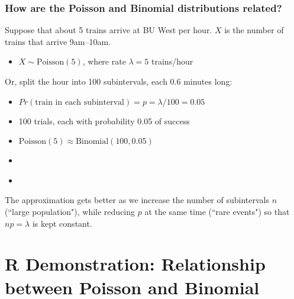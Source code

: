 \documentclass[slidestop,compress,mathserif]{beamer}
\begin{document}

\begin{frame}
\frametitle{How are the Poisson and Binomial distributions related?}

\begin{small}
Suppose that about 5 trains arrive at BU West per hour. $X$ is the number of trains that arrive 9am--10am.
    \begin{itemize}
        \item $X \sim \text{Poisson}(5)$, where rate $\lambda = 5$ trains/hour
    \end{itemize}
    
Or, split the hour into 100 subintervals, each 0.6 minutes long:
    \begin{itemize}
        \item $Pr(\text{train in each subinterval}) = p = \lambda/100 = 0.05$
        \item 100 trials, each with probability 0.05 of success
        \item $\text{Poisson}(5) \approx \text{Binomial}(100, 0.05)$
        \item \textcolor{teal}{}
        \item \textcolor{teal}{}
    \end{itemize}
    \pause
The approximation gets better as we increase the number of subintervals $n$ (``large population"), while reducing $p$ at the same time (``rare events") so that $np = \lambda$ is kept constant.

\end{small}

\end{frame}


\section{R Demonstration: Relationship between Poisson and Binomial}







\end{document}
